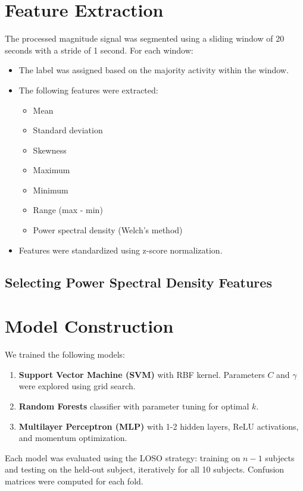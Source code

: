 \documentclass[runningheads]{llncs}
\begin{document}
\section{Feature Extraction}
The processed magnitude signal was segmented using a sliding window of 20 seconds with a stride of 1 second. For each window:
\begin{itemize}
    \item The label was assigned based on the majority activity within the window.
    \item The following features were extracted:
    \begin{itemize}
        \item Mean
        \item Standard deviation
        \item Skewness
        \item Maximum
        \item Minimum
        \item Range (max - min)
        \item Power spectral density (Welch's method)
    \end{itemize}
    \item Features were standardized using z-score normalization.
\end{itemize}

\subsection{Selecting Power Spectral Density Features}



\section{Model Construction}
We trained the following models:
\begin{enumerate}
    \item \textbf{Support Vector Machine (SVM)} with RBF kernel. Parameters $C$ and $\gamma$ were explored using grid search.
    \item \textbf{Random Forests} classifier with parameter tuning for optimal $k$.
    \item \textbf{Multilayer Perceptron (MLP)} with 1-2 hidden layers, ReLU activations, and momentum optimization.
\end{enumerate}

Each model was evaluated using the LOSO strategy: training on $n-1$ subjects and testing on the held-out subject, iteratively for all 10 subjects. Confusion matrices were computed for each fold.
\end{document}
